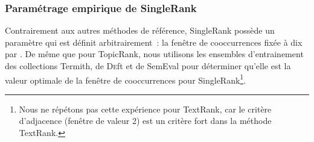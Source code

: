       \subsubsection{Paramétrage empirique de SingleRank}
      \label{subsubsec:main:domain_independent_keyphrase_extraction-unsupervised_automatic_keyphrase_extraction-evaluation-empirical_setting_of_singlerank}
        Contrairement aux autres méthodes de référence, SingleRank possède un
        paramètre qui est définit arbitrairement~: la fenêtre de cooccurrences
        fixée à dix par . De même que pour TopicRank,
        nous utilisons les ensembles d'entrainement des collections Termith, de
        \textsc{De}ft et de SemEval pour déterminer qu'elle est la valeur
        optimale de la fenêtre de cooccurrences pour SingleRank\footnote{Nous ne
        répétons pas cette expérience pour TextRank, car le critère d'adjacence
      (fenêtre de valeur 2) est un critère fort dans la méthode TextRank.}. 

